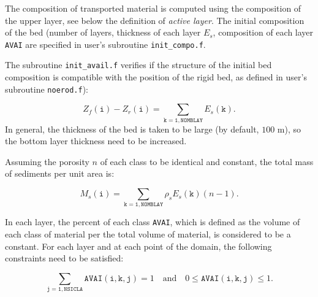 The composition of transported material is computed using the composition of
the upper layer, see below the definition of \emph{active layer}. The initial composition of the bed (number of layers, thickness of each layer $E_s$, composition of each layer \texttt{AVAI} are specified in user's subroutine \texttt{init\_compo.f}.

The subroutine \texttt{init\_avail.f} verifies if the structure of the initial bed
composition is compatible with the position of the rigid bed, as defined in
user's subroutine \texttt{noerod.f}):

\begin{equation}\label{eq:initavail}
Z_f\mathtt{(i)}-Z_r\mathtt{(i)} = \sum_{\mathtt{k=1,NOMBLAY}} E_s\mathtt{(k)}. 
\end{equation}
In general, the thickness of the bed is taken to be large (by default, $100$ m), so
the bottom layer thickness need to be increased.

Assuming the porosity $n$ of each class to be identical and constant, the total mass of sediments per unit area is:

\begin{equation}\label{eq:masssedclass}
M_s\mathtt{(i)} = \sum_{\mathtt{k=1,NOMBLAY}}\rho_s E_s\mathtt{(k)}(n-1). 
\end{equation}

In each layer, the percent of each class \texttt{AVAI}, which is defined as the
volume of each class of material per the total volume of material, is
considered to be a constant. For each layer and at each point of the domain, the following constraints
need to be satisfied:

\begin{equation*}
\sum_{\mathtt{j=1,NSICLA}} \mathtt{AVAI(i,k,j)} = 1\quad \text{and}\quad 0 \leq \mathtt{AVAI(i,k,j)} \leq 1.  
\end{equation*}

